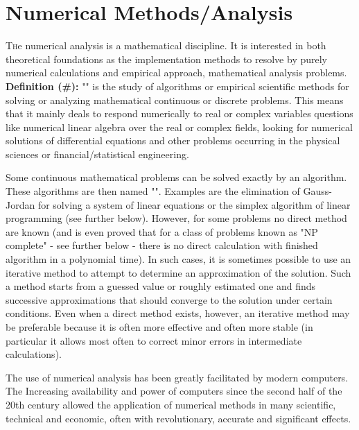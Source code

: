 	\newpage
	\thispagestyle{empty}
	\mbox{}
	\section{Numerical Methods/Analysis}\label{numerical methods}
	\lettrine[lines=4]{\color{BrickRed}T}he numerical analysis is a mathematical discipline. It is interested in both theoretical foundations as the implementation methods to resolve by purely numerical calculations and empirical approach, mathematical analysis problems.\\
	
\textbf{Definition (\#\mydef):} "" is the study of algorithms or empirical scientific methods for solving or analyzing mathematical continuous or discrete problems. This means that it mainly deals to respond numerically to real or complex variables questions like numerical linear algebra over the real or complex fields, looking for numerical solutions of differential equations and other problems occurring in the physical sciences or financial/statistical engineering.

Some continuous mathematical problems can be solved exactly by an algorithm. These algorithms are then named "". Examples are the elimination of Gauss-Jordan for solving a system of linear equations or the simplex algorithm of linear programming (see further below). However, for some problems no direct method are known (and is even proved that for a class of problems known as "NP complete" - see further below - there is no direct calculation with finished algorithm in a polynomial time). In such cases, it is sometimes possible to use an iterative method to attempt to determine an approximation of the solution. Such a method starts from a guessed value or roughly estimated one and finds successive approximations that should converge to the solution under certain conditions. Even when a direct method exists, however, an iterative method may be preferable because it is often more effective and often more stable (in particular it allows most often to correct minor errors in intermediate calculations).

	The use of numerical analysis has been greatly facilitated by modern computers. The Increasing availability and power of computers since the second half of the 20th century allowed the application of numerical methods in many scientific, technical and economic, often with revolutionary, accurate and significant effects.

